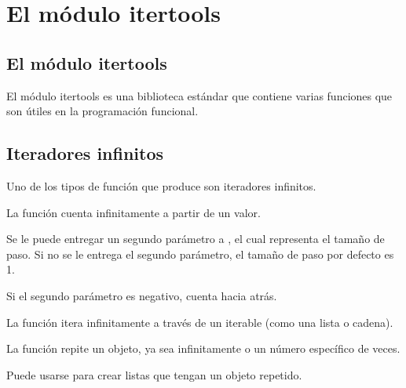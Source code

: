 \chapter{El módulo itertools}

\section{El módulo itertools}

El módulo itertools es una biblioteca estándar que contiene varias funciones que son útiles en la programación funcional.


\section{Iteradores infinitos}

Uno de los tipos de función que produce son iteradores infinitos.
\medskip

La función  cuenta infinitamente a partir de un valor.


Se le puede entregar un segundo parámetro a , el cual representa el tamaño de paso.
Si no se le entrega el segundo parámetro, el tamaño de paso por defecto es 1.


Si el segundo parámetro es negativo, cuenta hacia atrás.


La función itera infinitamente a través de un iterable (como una lista o cadena).



La función  repite un objeto, ya sea infinitamente o un número específico de veces.


Puede usarse para crear listas que tengan un objeto repetido.

